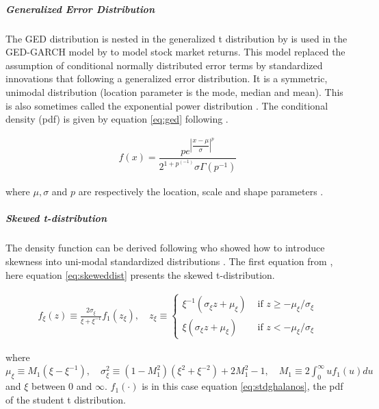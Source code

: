 \documentclass[a4paper, twoside]{templates/ociamthesis}
\begin{document}
\hypertarget{generalized-error-distribution}{%
\subparagraph{Generalized Error Distribution}\label{generalized-error-distribution}}

\noindent The GED distribution is nested in the generalized t distribution by \textcite{mcdonald1988} is used in the GED-GARCH model by \textcite{nelson1991} to model stock market returns. This model replaced the assumption of conditional normally distributed error terms by standardized innovations that following a generalized error distribution. It is a symmetric, unimodal distribution (location parameter is the mode, median and mean). This is also sometimes called the exponential power distribution \autocite{bollerslev2008}. The conditional density (pdf) is given by equation \eqref{eq:ged} following \textcite{ghalanos2020}.

\begin{align}
f(x) = \dfrac{p e^{\left|\dfrac{x-\mu}{\sigma}\right|^p}}{2^{1+p^(-1)}\sigma\Gamma(p^{-1})}
 \label{eq:ged}
\end{align}

where \(\mu, \sigma\) and \(p\) are respectively the location, scale and shape parameters .

\hypertarget{skewed-t-distribution}{%
\subparagraph{Skewed t-distribution}\label{skewed-t-distribution}}

\noindent The density function can be derived following \textcite{fernández1998} who showed how to introduce skewness into uni-modal standardized distributions \autocite{trottier2015}. The first equation from \textcite{trottier2015}, here equation \eqref{eq:skeweddist} presents the skewed t-distribution.

\begin{align}
f_{\xi}(z) \equiv \frac{2 \sigma_{\xi}}{\xi+\xi^{-1}} f_{1}\left(z_{\xi}\right), \quad z_{\xi} \equiv\left\{\begin{array}{ll}
\xi^{-1}\left(\sigma_{\xi} z+\mu_{\xi}\right) & \text { if } z \geq-\mu_{\xi} / \sigma_{\xi} \\
\xi\left(\sigma_{\xi} z+\mu_{\xi}\right) & \text { if } z<-\mu_{\xi} / \sigma_{\xi}
\end{array}\right.
 \label{eq:skeweddist}
\end{align}

\noindent where \(\mu_{\xi} \equiv M_{1}\left(\xi-\xi^{-1}\right), \quad \sigma_{\xi}^{2} \equiv\left(1-M_{1}^{2}\right)\left(\xi^{2}+\xi^{-2}\right)+2 M_{1}^{2}-1, \quad M_{1} \equiv 2 \int_{0}^{\infty} u f_{1}(u) d u\) and \(\xi\) between \(0\) and \(\infty\). \(f_1(\cdot)\) is in this case equation \eqref{eq:stdghalanos}, the pdf of the student t distribution.
\end{document}
